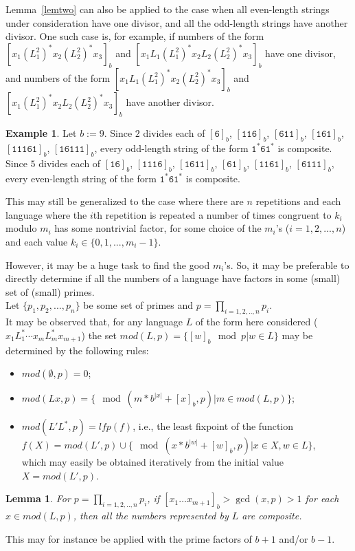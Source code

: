 \documentclass[12pt]{article}
\theoremstyle{plain}
\newtheorem{lemma}[theorem]{Lemma}
\theoremstyle{definition}
\newtheorem{example}[theorem]{Example}
\theoremstyle{remark}
\newcommand{\0}{\mathtt{0}}
\newcommand{\1}{\mathtt{1}}
\newcommand{\2}{\mathtt{2}}
\newcommand{\3}{\mathtt{3}}
\newcommand{\4}{\mathtt{4}}
\newcommand{\5}{\mathtt{5}}
\newcommand{\6}{\mathtt{6}}
\newcommand{\7}{\mathtt{7}}
\newcommand{\8}{\mathtt{8}}
\newcommand{\9}{\mathtt{9}}
\begin{document}
Lemma~\ref{lemtwo} can also be applied to the case when all even-length 
strings under consideration have one divisor, and all the odd-length 
strings have another divisor.  One such case is, for example,
if numbers of the form 
$[x_1(L_1^2)^*x_2(L_2^2)^*x_3]_b$ and $[x_1 L_1(L_1^2)^*x_2L_2(L_2^2)^*x_3]_b$ 
have one divisor, and numbers of the form $[x_1L_1(L_1^2)^*x_2(L_2^2)^*x_3]_b$ 
and $[x_1(L_1^2)^*x_2L_2(L_2^2)^*x_3]_b$ have another divisor.
\begin{example}
Let $b := 9$.
Since $2$ divides each of $[\6]_b$,
$[\1\1\6]_b$,
$[\6\1\1]_b$,
$[\1\6\1]_b$,
$[\1\1\1\6\1]_b$, 
$[\1\6\1\1\1]_b$, every odd-length string of the form $\1^*\6\1^*$ is 
composite.
Since $5$ divides each of $[\1\6]_b$,
$[\1\1\1\6]_b$,
$[\1\6\1\1]_b$,
$[\6\1]_b$,
$[\1\1\6\1]_b$, 
$[\6\1\1\1]_b$,
every even-length string of the form $\1^*\6\1^*$ is composite.
\end{example}

This may still be generalized to the case where there are $n$ repetitions and %
each language where the $i$th repetition is repeated a number of times congruent to 
$k_i$ modulo $m_i$ has some nontrivial factor, for some choice of the $m_i$'s ($i=1,2,...,n$) 
and each value $k_i\in\{0,1,...,m_i-1\}$. 

However, it may be a huge task to find the good $m_i$'s. So, it may be preferable to directly
determine if all the numbers of a language have factors in some (small) set of (small) primes.\\
Let $\{p_1,p_2,...,p_n\}$ be some set of primes and $p=\prod_{i=1,2,..,n} p_i$.\\
It may be observed that, for any  language $L$ of the form here considered ($x_1L_1^*\dotsm x_mL_m^*x_{m+1}$) the set $mod(L,p)=\{[w]_b \mod p|w\in L\}$ may be determined by the following rules:
\begin{itemize}
\item $mod(\emptyset,p)=0$;
\item $mod(L x,p)=\{\mod(m*b^{|x|}+[x]_b,p) |m\in mod(L,p)\}$;
\item  $mod(L' L^*,p)=lfp(f)$, i.e., the least fixpoint of the function\\
          $f(X)= mod(L',p)\cup\{\mod(x*b^{|w|}+[w]_b,p) |x\in X,w\in L\}$, \\which may easily be obtained iteratively from the initial value $X=mod(L',p)$.
\end{itemize}
\begin{lemma}
For $p=\prod_{i=1,2,..,n} p_i$, if $[x_1\ldots x_{m+1}]_b>\gcd(x,p)>1$ for each $x\in mod(L,p)$, then all the numbers represented by $L$ are composite.
\end{lemma}
This may for instance be applied with the prime factors of $b+1$ and/or $b-1$.
\end{document}
